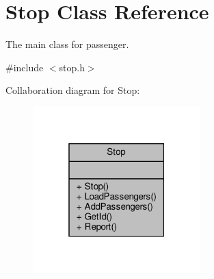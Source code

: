 \hypertarget{classStop}{}\section{Stop Class Reference}
\label{classStop}


The main class for passenger.  




{\ttfamily \#include $<$stop.\+h$>$}



Collaboration diagram for Stop\+:\nopagebreak
\begin{figure}[H]
\begin{center}
\leavevmode
\includegraphics[width=184pt]{classStop__coll__graph}
\end{center}
\end{figure}
